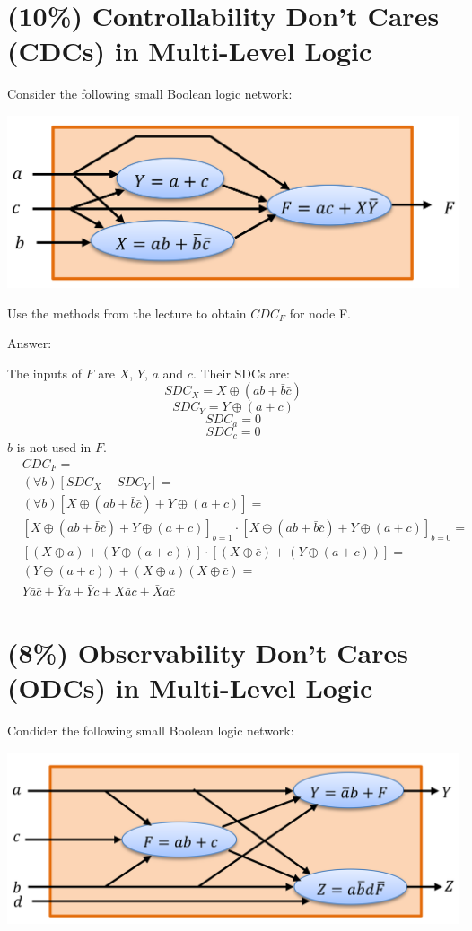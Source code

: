 \documentclass[12pt]{article}
\begin{document}
\section{(10\%) Controllability Don't Cares (CDCs) in Multi-Level Logic}
Consider the following small Boolean logic network:
\begin{center}
    \includegraphics[width = 5.50in, height = 2.00in]{cdc.png}
\end{center}

Use the methods from the lecture to obtain $CDC_F$ for node F.

Answer:

The inputs of $F$ are $X$, $Y$, $a$ and $c$.
Their SDCs are:
\[SDC_X=X\oplus{(ab+\bar{b}\bar{c})}\]
\[SDC_Y=Y\oplus{(a+c)}\]
\[SDC_a=0\]
\[SDC_c=0\]
$b$ is not used in $F$.
\[
\begin{split}
    & CDC_F= \\
    & (\forall{b})[SDC_X+SDC_Y]= \\
    & (\forall{b})[X\oplus{(ab+\bar{b}\bar{c})} + Y\oplus{(a+c)}]= \\
    & [X\oplus{(ab+\bar{b}\bar{c})} + Y\oplus{(a+c)}]_{b=1}\cdot [X\oplus{(ab+\bar{b}\bar{c})} + Y\oplus{(a+c)}]_{b=0} = \\
    & [(X\oplus{a}) + (Y\oplus{(a+c)})]\cdot [(X\oplus{\bar{c}}) + (Y\oplus{(a+c)})] = \\
    & (Y\oplus{(a+c)}) + (X\oplus{a})(X\oplus{\bar{c}}) = \\
    & Y\bar{a}\bar{c} + \bar{Y}a + \bar{Y}c + X\bar{a}c + \bar{X}a\bar{c}
\end{split}
\]

\section{(8\%) Observability Don't Cares (ODCs) in Multi-Level Logic}
Condider the following small Boolean logic network:
\begin{center}
    \includegraphics[width = 5.50in, height = 2.00in]{odc.png}
\end{center}
\end{document}
